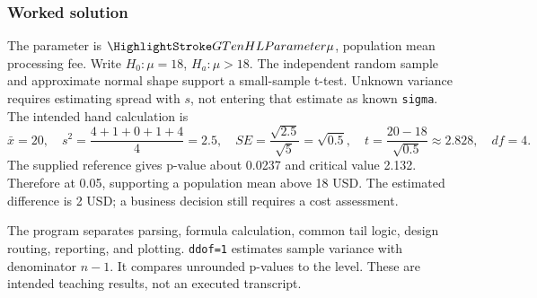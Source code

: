 \subsubsection*{Worked solution}\label{sol:automation}
The parameter is $\Pop{\mu}$, population mean processing fee. Write $H_0:\mu=18$, $H_a:\mu>18$. The independent random sample and approximate normal shape support a small-sample t-test. Unknown variance requires estimating spread with $s$, not entering that estimate as known \texttt{sigma}. The intended hand calculation is
\[
\bar x=20,\quad s^2=\frac{4+1+0+1+4}{4}=2.5,\quad
SE=\frac{\sqrt{2.5}}{\sqrt5}=\sqrt{0.5},\quad
t=\frac{20-18}{\sqrt{0.5}}\approx2.828,\quad df=4.
\]
The supplied reference gives p-value about 0.0237 and critical value 2.132. Therefore  at 0.05, supporting a population mean above 18 USD. The estimated difference is 2 USD; a business decision still requires a cost assessment.

The program separates parsing, formula calculation, common tail logic, design routing, reporting, and plotting. \texttt{ddof=1} estimates sample variance with denominator $n-1$. It compares unrounded p-values to the level. These are intended teaching results, not an executed transcript.

